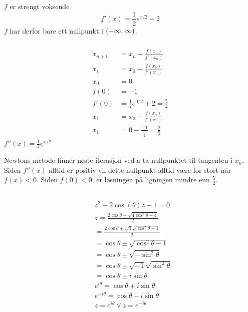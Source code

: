 \documentclass[defaultpackages]{cheatsheet}
\newcommand*{\skippingparagraph}{\par\vspace{\baselineskip}\noindent}
\begin{document}
\subsubsection{}
$f$ er strengt voksende $$f'(x) = \frac{1}{2} e^{x/2} + 2$$
$f$ har derfor bare ett nullpunkt i $\interval({-\infty,\;\infty})$.
\subsubsection{}
\begin{align*}
	x_{n+1} &= x_n - \frac{f(x_n)}{f'(x_n)}\\
	x_1 &= x_0 - \frac{f(x_0)}{f'(x_0)}\\
	x_0 &= 0\\
	f(0) &= -1\\
	f'(0) &= \frac{1}{2} e^{0/2} + 2 = \frac{5}{2}\\
	x_1 &= x_0 - \frac{f(x_0)}{f'(x_0)}\\
	x_1 &= 0 - \frac{-1}{\frac{5}{2}} = \frac{2}{5}
\end{align*}
$f''(x) = \frac{1}{4} e^{x/2}$
\skippingparagraph
Newtons metode finner neste iterasjon ved å ta nullpunktet til tangenten i $x_n$. Siden $f''(x)$ alltid er positiv vil dette nullpunkt alltid være for stort når $f(x) < 0$. Siden $f(0) < 0$, er løsningen på ligningen mindre enn $\frac{5}{2}$.
\subsection{}
\subsubsection{}
\begin{align*}
&	z^2 - 2\cos(\theta) z + 1 = 0\\
&	z = \frac{2\cos \theta \pm \sqrt{4 \cos^2\theta - 4}}{2}\\
&	 = \frac{2 \cos \theta \pm \sqrt{4}\sqrt{\cos^2\theta - 1}}{2}\\
&	= \cos \theta \pm \sqrt{\cos^2 \theta - 1}\\
&	= \cos\theta\pm\sqrt{-\sin^2\theta}\tag{merk: $\cos^2\theta - 1 = -\sin^2 \theta$}\\
&	= \cos\theta\pm\sqrt{-1}\sqrt{\sin^2\theta}\\
&	= \cos \theta \pm i\sin\theta\\
&	e^{i\theta} = \cos\theta + i\sin\theta\\
&	e^{-i\theta} = \cos\theta - i\sin\theta\\
&	z = e^{i\theta} \vee z = e^{-i\theta}
\end{align*}
\end{document}

